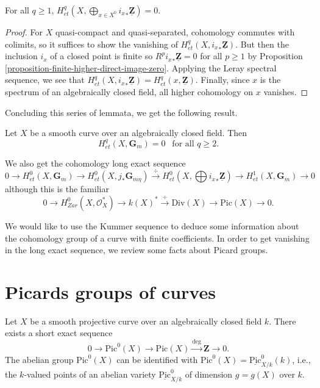 \begin{lemma}
\label{lemma-cohomology-istar-Z}
For all $q \geq 1$, $H_{et}^q(X, \bigoplus_{x \in X^0} {i_x}_*
\underline{\mathbf{Z}}) = 0$.
\end{lemma}

\begin{proof}
For $X$ quasi-compact and quasi-separated, cohomology commutes with colimits,
so it suffices to show the vanishing of $H_{et}^q(X, {i_x}_*
\underline{\mathbf{Z}})$. But then the inclusion $i_x$ of a closed point is
finite so $R^p {i_x}_* \underline{\mathbf{Z}} = 0$ for all $p \geq 1$ by
Proposition \ref{proposition-finite-higher-direct-image-zero}.
Applying the Leray spectral sequence, we see that
$H_{et}^q(X, {i_x}_* \underline{\mathbf{Z}}) =
H_{et}^q(x, \underline{\mathbf{Z}})$.
Finally, since $x$ is the spectrum of an
algebraically closed field, all higher cohomology on $x$ vanishes.
\end{proof}

\noindent
Concluding this series of lemmata, we get the following result.

\begin{theorem}
\label{theorem-vanishing-cohomology-Gm-curve}
Let $X$ be a smooth curve over an algebraically closed field. Then
$$
H_{et}^q(X, \mathbf{G}_m) = 0 \ \ \text{ for all } q \geq 2.
$$
\end{theorem}

\noindent
We also get the cohomology long exact sequence
$$
0 \to H_{et}^0(X,\mathbf{G}_m) \to H_{et}^0(X,j_*\mathbf{G}_{m\eta})
\xrightarrow{\div} H_{et}^0(X,\bigoplus {i_x}_*\underline{\mathbf{Z}}) \to
H_{et}^1(X,\mathbf{G}_m) \to 0
$$
although this is the familiar
$$
0 \to H_{Zar}^0(X,\mathcal{O}_X^*) \to k(X)^* \xrightarrow{\div} \text{Div}(X)
\to \text{Pic}(X) \to 0.
$$

\medskip\noindent
We would like to use the Kummer sequence to deduce some information about the
cohomology group of a curve with finite coefficients. In order to get vanishing
in the long exact sequence, we review some facts about Picard groups.





\section{Picards groups of curves}
\label{section-pic-curves}

\noindent
Let $X$ be a smooth projective curve over an algebraically closed field $k$.
There exists a short exact sequence
$$
0\to \text{Pic}^0(X) \to \text{Pic}(X)\xrightarrow{\deg} \mathbf{Z} \to 0.
$$
The abelian group $\text{Pic}^0(X)$ can be identified with $\text{Pic}^0(X) =
\underline{\text{Pic}}^0_{X/k}(k)$, i.e., the $k$-valued points of an
abelian variety $\underline{\text{Pic}}^0_{X/k}$ of dimension $g=g(X)$ over
$k$.

